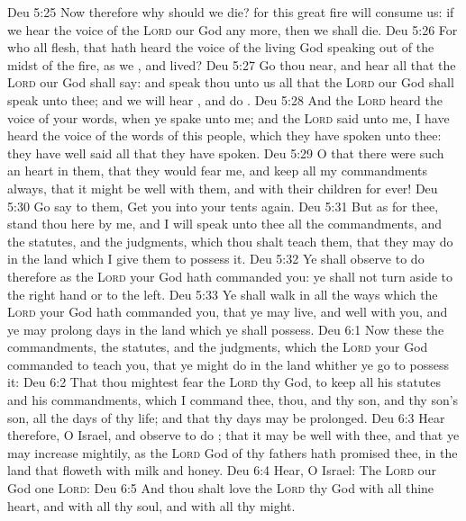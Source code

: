 \vs Deu 5:25 Now therefore why should we die? for this great fire will consume us: if we hear the voice of the \textsc{Lord} our God any more, then we shall die.
\vs Deu 5:26 For who  all flesh, that hath heard the voice of the living God speaking out of the midst of the fire, as we , and lived?
\vs Deu 5:27 Go thou near, and hear all that the \textsc{Lord} our God shall say: and speak thou unto us all that the \textsc{Lord} our God shall speak unto thee; and we will hear , and do .
\vs Deu 5:28 And the \textsc{Lord} heard the voice of your words, when ye spake unto me; and the \textsc{Lord} said unto me, I have heard the voice of the words of this people, which they have spoken unto thee: they have well said all that they have spoken.
\vs Deu 5:29 O that there were such an heart in them, that they would fear me, and keep all my commandments always, that it might be well with them, and with their children for ever!
\vs Deu 5:30 Go say to them, Get you into your tents again.
\vs Deu 5:31 But as for thee, stand thou here by me, and I will speak unto thee all the commandments, and the statutes, and the judgments, which thou shalt teach them, that they may do  in the land which I give them to possess it.
\vs Deu 5:32 Ye shall observe to do therefore as the \textsc{Lord} your God hath commanded you: ye shall not turn aside to the right hand or to the left.
\vs Deu 5:33 Ye shall walk in all the ways which the \textsc{Lord} your God hath commanded you, that ye may live, and  well with you, and  ye may prolong  days in the land which ye shall possess.
\vs Deu 6:1 Now these  the commandments, the statutes, and the judgments, which the \textsc{Lord} your God commanded to teach you, that ye might do  in the land whither ye go to possess it:
\vs Deu 6:2 That thou mightest fear the \textsc{Lord} thy God, to keep all his statutes and his commandments, which I command thee, thou, and thy son, and thy son's son, all the days of thy life; and that thy days may be prolonged.
\vs Deu 6:3 Hear therefore, O Israel, and observe to do ; that it may be well with thee, and that ye may increase mightily, as the \textsc{Lord} God of thy fathers hath promised thee, in the land that floweth with milk and honey.
\vs Deu 6:4 Hear, O Israel: The \textsc{Lord} our God  one \textsc{Lord}:
\vs Deu 6:5 And thou shalt love the \textsc{Lord} thy God with all thine heart, and with all thy soul, and with all thy might.
